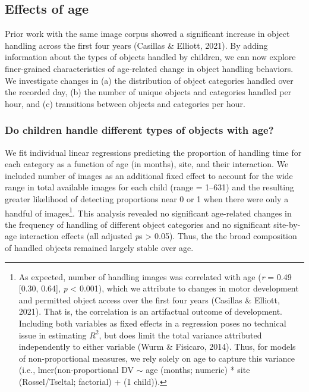 \documentclass[10pt, letterpaper]{article}
\begin{document}
\hypertarget{effects-of-age}{%
\subsection{Effects of age}\label{effects-of-age}}

Prior work with the same image corpus showed a significant increase in
object handling across the first four years (Casillas \& Elliott, 2021).
By adding information about the types of objects handled by children, we
can now explore finer-grained characteristics of age-related change in
object handling behaviors. We investigate changes in (a) the
distribution of object categories handled over the recorded day, (b) the
number of unique objects and categories handled per hour, and (c)
transitions between objects and categories per hour.

\hypertarget{do-children-handle-different-types-of-objects-with-age}{%
\subsubsection{Do children handle different types of objects with
age?}\label{do-children-handle-different-types-of-objects-with-age}}

We fit individual linear regressions predicting the proportion of
handling time for each category as a function of age (in months), site,
and their interaction. We included number of images as an additional
fixed effect to account for the wide range in total available images for
each child (range = 1--631) and the resulting greater likelihood of
detecting proportions near 0 or 1 when there were only a handful of
images\footnote{As expected, number of handling images was correlated
  with age (\emph{r} = 0.49 {[}0.30, 0.64{]}, \emph{p} \textless{}
  0.001), which we attribute to changes in motor development and
  permitted object access over the first four years (Casillas \&
  Elliott, 2021). That is, the correlation is an artifactual outcome of
  development. Including both variables as fixed effects in a regression
  poses no technical issue in estimating \(R^{2}\), but does limit the
  total variance attributed independently to either variable (Wurm \&
  Fisicaro, 2014). Thus, for models of non-proportional measures, we
  rely solely on age to capture this variance (i.e.,
  lmer(non-proportional DV \({\sim}\) age (months; numeric) * site
  (Rossel/Tseltal; factorial) + (1 \textbar{} child)).}. This analysis
revealed no significant age-related changes in the frequency of handling
of different object categories and no significant site-by-age
interaction effects (all adjusted \emph{p}s \textgreater{} 0.05). Thus,
the the broad composition of handled objects remained largely stable
over age. \newline
\end{document}
